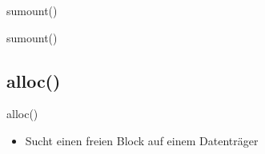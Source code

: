 \documentclass{beamer}
\begin{document}
\begin{frame}{sumount()}
\end{frame}

\begin{frame}{sumount()}
\end{frame}




\subsection{alloc()}

\begin{frame}{alloc()}
    \begin{itemize}
        \item Sucht einen freien Block auf einem Datenträger
    \end{itemize}
\end{frame}
\end{document}

